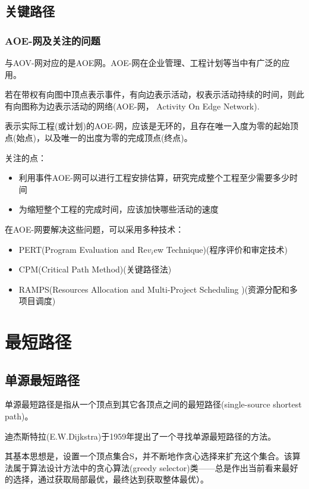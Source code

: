 \documentclass[AutoFakeBold]{LZUThesis2007}
\begin{document}
		\subsection{关键路径}
			\subsubsection{AOE-网及关注的问题}
与AOV-网对应的是AOE网。AOE-网在企业管理、工程计划等当中有广泛的应用。

若在带权有向图中顶点表示事件，有向边表示活动，权表示活动持续的时间，则此有向图称为边表示活动的网络(AOE-网， Activity On Edge Network).

表示实际工程(或计划)的AOE-网，应该是无环的，且存在唯一入度为零的起始顶点(始点)，以及唯一的出度为零的完成顶点(终点)。

关注的点：
\begin{itemize}
	\item 利用事件AOE-网可以进行工程安排估算，研究完成整个工程至少需要多少时间
	\item 为缩短整个工程的完成时间，应该加快哪些活动的速度
\end{itemize}


在AOE-网要解决这些问题，可以采用多种技术：
\begin{itemize}
	\item PERT(Program Evaluation and Re$v_{i}$ew Technique)(程序评价和审定技术)
	\item CPM(Critical Path Method)(关键路径法)
	\item RAMPS(Resources Allocation and Multi-Project Scheduling )(资源分配和多项目调度)

\end{itemize}

	\section{最短路径}
		\subsection{单源最短路径}
单源最短路径是指从一个顶点到其它各顶点之间的最短路径(single-source shortest path)。

迪杰斯特拉(E.W.Dijkstra)于1959年提出了一个寻找单源最短路径的方法。

其基本思想是，设置一个顶点集合S，并不断地作贪心选择来扩充这个集合。该算法属于算法设计方法中的贪心算法(greedy selector)类——总是作出当前看来最好的选择，通过获取局部最优，最终达到获取整体最优）。
\end{document}
